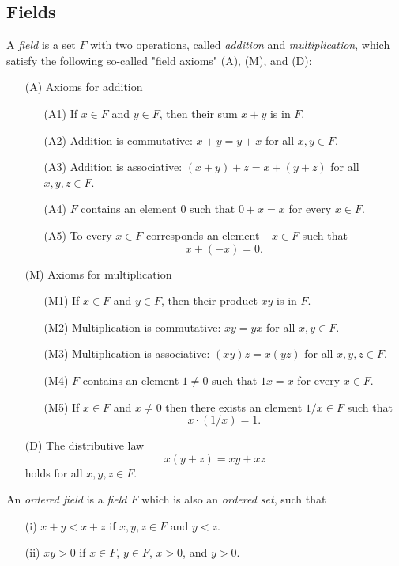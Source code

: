 \subsection{Fields}
\begin{definition}
A \emph{field} is a set $F$ with two operations, called \emph{addition} and \emph{multiplication}, which satisfy the following so-called "field axioms" (A), (M), and (D):
\begin{enumerate}
\item[(A)] Axioms for addition
\begin{itemize}
    \item[(A1)] If $x \in F$ and $y \in F$, then their sum $x+y$ is in $F$.
    \item[(A2)] Addition is commutative: $x+y=y+x$ for all $x,y \in F$.
    \item[(A3)] Addition is associative: $(x+y)+z=x+(y+z)$ for all $x,y,z \in F$.
    \item[(A4)] $F$ contains an element $0$ such that $0+x=x$ for every $x \in F$.
    \item[(A5)] To every $x \in F$ corresponds an element $-x \in F$ such that \[x+(-x)=0.\]
\end{itemize}
\item[(M)] Axioms for multiplication
\begin{itemize}
    \item[(M1)] If $x \in F$ and $y \in F$, then their product $xy$ is in $F$.
    \item[(M2)] Multiplication is commutative: $xy=yx$ for all $x,y \in F$.
    \item[(M3)] Multiplication is associative: $(xy)z=x(yz)$ for all $x,y,z \in F$.
    \item[(M4)] $F$ contains an element $1 \neq 0$ such that $1x=x$ for every $x \in F$.
    \item[(M5)] If $x \in F$ and $x \neq 0$ then there exists an element $1/x \in F$ such that \[x \cdot (1/x) = 1.\]
\end{itemize}
\item[(D)] The distributive law
\[
x(y+z)=xy+xz
\]
holds for all $x,y,z \in F$.
\end{enumerate}
\end{definition}
\begin{definition}
An \emph{ordered field} is a \emph{field $F$} which is also an \emph{ordered set}, such that
\begin{itemize}
    \item[(i)] $x+y<x+z$ if $x,y,z \in F$ and $y<z$.
    \item[(ii)] $xy>0$ if $x \in F$, $y \in F$, $x>0$, and $y>0$.
\end{itemize}
\end{definition}


